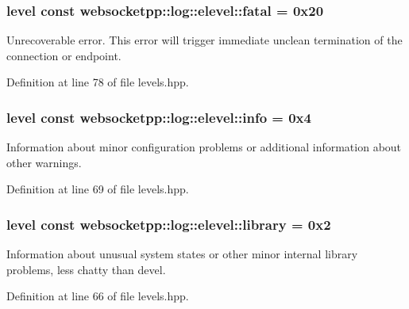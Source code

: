 \subsubsection[{\texorpdfstring{fatal}{fatal}}]{\setlength{\rightskip}{0pt plus 5cm}level const websocketpp\+::log\+::elevel\+::fatal = 0x20\hspace{0.3cm}{\ttfamily [static]}}\hypertarget{structwebsocketpp_1_1log_1_1elevel_aa909808e0fb142742a0ebd2dca54f517}{}\label{structwebsocketpp_1_1log_1_1elevel_aa909808e0fb142742a0ebd2dca54f517}
Unrecoverable error. This error will trigger immediate unclean termination of the connection or endpoint. 

Definition at line 78 of file levels.\+hpp.

\subsubsection[{\texorpdfstring{info}{info}}]{\setlength{\rightskip}{0pt plus 5cm}level const websocketpp\+::log\+::elevel\+::info = 0x4\hspace{0.3cm}{\ttfamily [static]}}\hypertarget{structwebsocketpp_1_1log_1_1elevel_a3ab47987a682f0de7b1d0df8c9c3b9d2}{}\label{structwebsocketpp_1_1log_1_1elevel_a3ab47987a682f0de7b1d0df8c9c3b9d2}
Information about minor configuration problems or additional information about other warnings. 

Definition at line 69 of file levels.\+hpp.

\subsubsection[{\texorpdfstring{library}{library}}]{\setlength{\rightskip}{0pt plus 5cm}level const websocketpp\+::log\+::elevel\+::library = 0x2\hspace{0.3cm}{\ttfamily [static]}}\hypertarget{structwebsocketpp_1_1log_1_1elevel_a2b862d4f143d9b77619ddbacd1763674}{}\label{structwebsocketpp_1_1log_1_1elevel_a2b862d4f143d9b77619ddbacd1763674}
Information about unusual system states or other minor internal library problems, less chatty than devel. 

Definition at line 66 of file levels.\+hpp.

